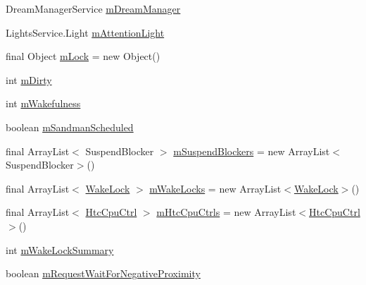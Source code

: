 \begin{DoxyCompactItemize}
\item 
Dream\-Manager\-Service \hyperlink{classcom_1_1android_1_1server_1_1power_1_1PowerManagerService_a5007de59f9dc20fb9f05c83e94d82bf0}{m\-Dream\-Manager}
\item 
Lights\-Service.\-Light \hyperlink{classcom_1_1android_1_1server_1_1power_1_1PowerManagerService_aee856df1479631f78e8e848c783c9704}{m\-Attention\-Light}
\item 
final Object \hyperlink{classcom_1_1android_1_1server_1_1power_1_1PowerManagerService_a7aad3f627f3035bde7674bd7069baecf}{m\-Lock} = new Object()
\item 
int \hyperlink{classcom_1_1android_1_1server_1_1power_1_1PowerManagerService_ac68257fbed10dad0f7359d61d03e1fe2}{m\-Dirty}
\item 
int \hyperlink{classcom_1_1android_1_1server_1_1power_1_1PowerManagerService_a189bf90892753d87b458fac3cecbed9d}{m\-Wakefulness}
\item 
boolean \hyperlink{classcom_1_1android_1_1server_1_1power_1_1PowerManagerService_a0caf6be0b5608d195571fd01b70333df}{m\-Sandman\-Scheduled}
\item 
final Array\-List$<$ Suspend\-Blocker $>$ \hyperlink{classcom_1_1android_1_1server_1_1power_1_1PowerManagerService_ab2aa3feb0abba4de5525afa05633d2e3}{m\-Suspend\-Blockers} = new Array\-List$<$Suspend\-Blocker$>$()
\item 
final Array\-List$<$ \hyperlink{classcom_1_1android_1_1server_1_1power_1_1PowerManagerService_1_1WakeLock}{Wake\-Lock} $>$ \hyperlink{classcom_1_1android_1_1server_1_1power_1_1PowerManagerService_acd92b5c65febf2ecc2c25633f61d3773}{m\-Wake\-Locks} = new Array\-List$<$\hyperlink{classcom_1_1android_1_1server_1_1power_1_1PowerManagerService_1_1WakeLock}{Wake\-Lock}$>$()
\item 
final Array\-List$<$ \hyperlink{classcom_1_1android_1_1server_1_1power_1_1PowerManagerService_1_1HtcCpuCtrl}{Htc\-Cpu\-Ctrl} $>$ \hyperlink{classcom_1_1android_1_1server_1_1power_1_1PowerManagerService_aad0c790dfe893d94026f786ea9d2b950}{m\-Htc\-Cpu\-Ctrls} = new Array\-List$<$\hyperlink{classcom_1_1android_1_1server_1_1power_1_1PowerManagerService_1_1HtcCpuCtrl}{Htc\-Cpu\-Ctrl}$>$()
\item 
int \hyperlink{classcom_1_1android_1_1server_1_1power_1_1PowerManagerService_a6cf37384f9c8e09aeef23b0e1e27d09d}{m\-Wake\-Lock\-Summary}
\item 
boolean \hyperlink{classcom_1_1android_1_1server_1_1power_1_1PowerManagerService_ad9da9a0d701a53e6f3b66ff587632008}{m\-Request\-Wait\-For\-Negative\-Proximity}

\end{DoxyCompactItemize}
